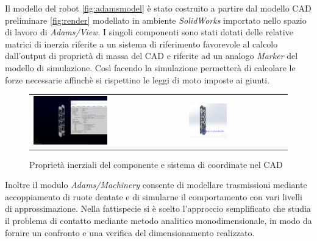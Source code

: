 \documentclass[%
corpo=11pt,
twoside,
 stile=classica,
oldstyle,
greek,%
]{toptesi}
\begin{document}
	Il modello del robot \ref{fig:adamsmodel} è stato costruito a partire dal modello CAD preliminare \ref{fig:render} modellato in ambiente \textit{SolidWorks} importato nello spazio di lavoro di \textit{Adams/View}. I singoli componenti sono stati dotati delle relative matrici di inerzia riferite a un sistema di riferimento favorevole al calcolo dall'output di proprietà di massa del CAD e riferite ad un analogo \textit{Marker} del modello di simulazione. Così facendo la simulazione permetterà di calcolare le forze necessarie affinchè si rispettino le leggi di moto imposte ai giunti.
			\begin{figure}
			\centering
			\begin{tabular} {ll}
		
			\includegraphics[width=0.5\textwidth]{Screen/inertia.png}
			&
			\includegraphics[width=0.4\textwidth]{Screen/coordinate.png}
			\end{tabular}
			\caption{Proprietà inerziali del componente e sistema di coordinate nel CAD}
			\label{fig:inertia}
			\end{figure}
	 Inoltre il modulo \textit{Adams/Machinery} consente di modellare trasmissioni mediante accoppiamento di ruote dentate e di simularne il comportamento con vari livelli di approssimazione. Nella fattispecie si è scelto l'approccio semplificato che studia il problema di contatto mediante metodo analitico monodimensionale, in modo da fornire un confronto e una verifica del dimensionamento realizzato. 	
\end{document}
